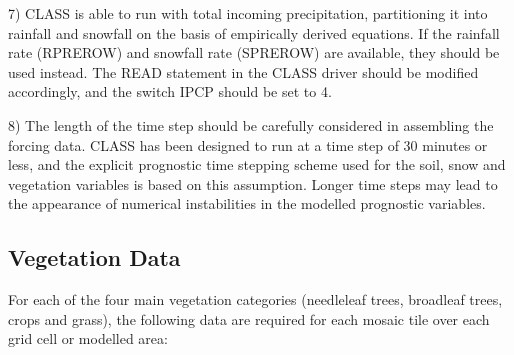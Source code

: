 7) C\+L\+A\+S\+S is able to run with total incoming precipitation, partitioning it into rainfall and snowfall on the basis of empirically derived equations. If the rainfall rate (R\+P\+R\+E\+R\+O\+W) and snowfall rate (S\+P\+R\+E\+R\+O\+W) are available, they should be used instead. The R\+E\+A\+D statement in the C\+L\+A\+S\+S driver should be modified accordingly, and the switch I\+P\+C\+P should be set to 4.

8) The length of the time step should be carefully considered in assembling the forcing data. C\+L\+A\+S\+S has been designed to run at a time step of 30 minutes or less, and the explicit prognostic time stepping scheme used for the soil, snow and vegetation variables is based on this assumption. Longer time steps may lead to the appearance of numerical instabilities in the modelled prognostic variables.\hypertarget{index_vegetationData}{}\subsection{Vegetation Data}\label{index_vegetationData}
For each of the four main vegetation categories (needleleaf trees, broadleaf trees, crops and grass), the following data are required for each mosaic tile over each grid cell or modelled area\+:


